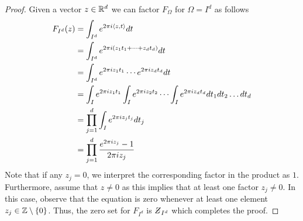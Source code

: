 \documentclass[../thesis.tex]{subfiles}
\begin{document}
\begin{proof} %
    Given a vector $z \in \mathbb{R}^d$ we can factor $F_{\Omega}$ for $\Omega = I^d$ as follows
    \begin{align*}
        F_{I^d} (z) &= \int_{I^d} e^{2 \pi i \braa{z,t}} dt\\
        &= \int_{I^d} e^{2\pi i  (z_1 t_1 + \dots +z_d t_d)} dt\\
        &= \int_{I^d} e^{2\pi i z_1 t_1}  \cdots e^{2\pi i z_d t_d}  dt\\
        &= \int_{I} e^{2\pi i z_1 t_1} \int_{I} e^{2\pi i z_2 t_2}  \cdots \int_{I} e^{2\pi i z_d t_d}  dt_1 dt_2\dots dt_d\\ %
        &= \prod_{j=1}^d \int_I e^{2\pi i z_j t_j} dt_j\\
        &= \prod_{j=1}^d \frac{e^{2 \pi i z_j} -1}{2 \pi i z_j}
    \end{align*}
    Note that if any $z_j = 0$, we interpret the corresponding factor in the product as $1$. Furthermore, assume that $z\neq 0$ as this implies that at least one factor $z_j\neq 0$. In this case, observe that the equation is zero whenever at least one element $z_j\in \mathbb{Z}\setminus\{0\}$. %
    Thus, the zero set for $F_{I^d}$ is $\Zstroke_{I^d}$ which completes the proof. %
\end{proof}
\end{document}
